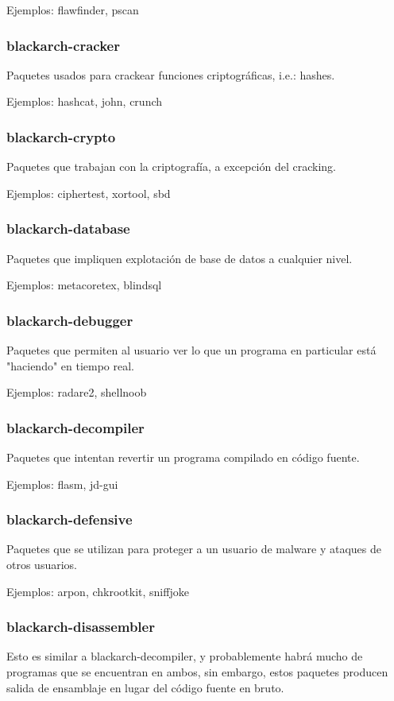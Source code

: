 \documentclass[a4paper, oneside, 11pt]{book}
\begin{document}
Ejemplos: flawfinder, pscan

\subsubsection{blackarch-cracker}
Paquetes usados para crackear funciones criptogr\'aficas, i.e.: hashes.

Ejemplos: hashcat, john, crunch

\subsubsection{blackarch-crypto}
Paquetes que trabajan con la criptograf\'ia, a excepci\'on del cracking.

Ejemplos: ciphertest, xortool, sbd

\subsubsection{blackarch-database}
Paquetes que impliquen explotaci\'on de base de datos a cualquier nivel.

Ejemplos: metacoretex, blindsql

\subsubsection{blackarch-debugger}
Paquetes que permiten al usuario ver lo que un programa en particular est\'a "haciendo" en tiempo real.

Ejemplos: radare2, shellnoob

\subsubsection{blackarch-decompiler}
Paquetes que intentan revertir un programa compilado en c\'odigo fuente.

Ejemplos: flasm, jd-gui

\subsubsection{blackarch-defensive}
Paquetes que se utilizan para proteger a un usuario de malware y ataques de otros usuarios.

Ejemplos: arpon, chkrootkit, sniffjoke

\subsubsection{blackarch-disassembler}
Esto es similar a blackarch-decompiler, y probablemente habrá mucho
de programas que se encuentran en ambos, sin embargo, estos paquetes producen salida de ensamblaje en lugar del código fuente en bruto.
\end{document}
